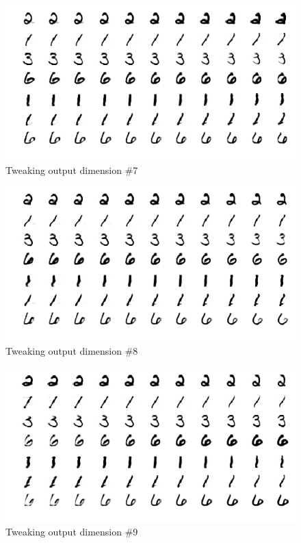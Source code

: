 \documentclass[10pt,twocolumn,letterpaper]{article}
\begin{document}
\begin{figure}[ht]
	\includegraphics[width=\columnwidth]{j7}
	\caption{Tweaking output dimension \#7}
\end{figure}
\begin{figure}[ht]
	\includegraphics[width=\columnwidth]{j8}
	\caption{Tweaking output dimension \#8}
\end{figure}
\begin{figure}[ht]
	\includegraphics[width=\columnwidth]{j9}
	\caption{Tweaking output dimension \#9}
\end{figure}
\end{document}
